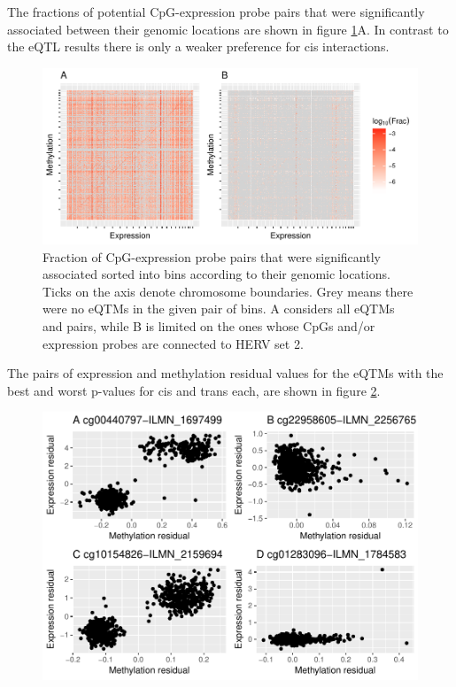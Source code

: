 \documentclass[a4paper,12pt,twoside,openright]{article}
\begin{document}
The fractions of potential CpG-expression probe pairs that were significantly associated between their genomic locations are shown in figure \ref{fig:global.eqtm.heatmap}A. In contrast to the eQTL results there is only a weaker preference for cis interactions. 

\begin{figure}[tb]
	\includegraphics[scale = 1, keepaspectratio = true]{../figures/eqtm_all_herv_heatmap}  
	\caption{Fraction of CpG-expression probe pairs that were significantly associated sorted into bins according to their genomic locations. Ticks on the axis denote chromosome boundaries. Grey means there were no eQTMs in the given pair of bins. A considers all eQTMs and pairs, while B is limited on the ones whose CpGs and/or expression probes are connected to HERV set 2.}
    \label{fig:global.eqtm.heatmap}
\end{figure}

The pairs of expression and methylation residual values for the eQTMs with the best and worst p-values for cis and trans each, are shown in figure \ref{fig:best.worst.eqtm.scatter}. 

\begin{figure}[tb]
	\includegraphics[scale = 1, keepaspectratio = true]{../figures/best_worst_eqtm_scatter}  
	\caption{}
    \label{fig:best.worst.eqtm.scatter}
\end{figure}
\end{document}
